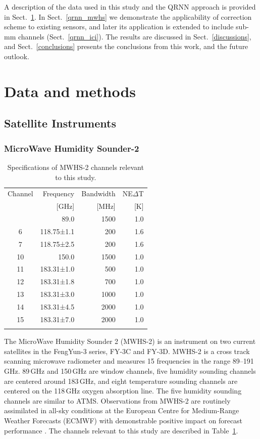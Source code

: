 \documentclass[amt, manuscript]{copernicus}
\begin{document}
A description of the data used in this study and the QRNN approach is provided
in Sect.~\ref{data_methods}. In Sect.~\ref{qrnn_mwhs} we demonstrate the
applicability of correction scheme to existing sensors, and later its
application is extended to include sub-mm channels (Sect.~\ref{qrnn_ici}). The
results are discussed in Sect.~\ref{discussions}, and Sect.~\ref{conclusions}
presents the conclusions from this work, and the future outlook.


\section{Data and methods}
\label{data_methods}
%
\subsection{Satellite Instruments}
%
\subsubsection{ MicroWave Humidity Sounder-2}
%
\begin{table}[t]
	\caption{Specifications of MWHS-2 channels relevant to this study.}
	\label{tab:specifications_MWHS2}	
	\begin{tabular}{crrr}
		\tophline
		Channel & Frequency 	& Bandwidth & NE$\Delta$T \\
		& [GHz]			& [MHz]		& [K]		\\
		\middlehline
		1	&	89.0   		  & 1500			&	1.0	\\
		6	&	118.75±1.1    & \phantom{0}200 	&	1.6\\
		7	&	118.75±2.5    & \phantom{0}200 	&	1.6\\
		10	&	150.0         & 1500 			&	1.0 \\
		11	&	183.31±1.0      & \phantom{0}500  &	1.0 \\
		12  & 	183.31±1.8    & \phantom{0}700 	&   1.0\\
		13  & 	183.31±3.0      & 1000    		&	1.0	\\
		14  & 	183.31±4.5    & 2000    		&	1.0\\
		15  & 	183.31±7.0      & 2000  			&	1.0  \\
		\bottomhline
	\end{tabular}
	\belowtable{} %
\end{table}
The MicroWave Humidity Sounder 2 (MWHS-2) is an instrument on two current satellites in the FengYun-3 series, FY-3C and FY-3D. MWHS-2 is a cross track scanning microwave radiometer and measures 15 frequencies in the range 89--191\,GHz. 89\,GHz and 150\,GHz are window channels, five humidity sounding channels are centered around 183\,GHz, and eight temperature sounding channels are centered on the 118\,GHz oxygen absorption line. The five humidity sounding channels are similar to ATMS. Observations from MWHS-2 are routinely assimilated in all-sky conditions at the European Centre for Medium-Range Weather Forecasts (ECMWF) with demonstrable positive impact on forecast performance \citep{duncan2020MWHS}. The channels relevant to this study are described in Table~\ref{tab:specifications_MWHS2}. 
\end{document}
